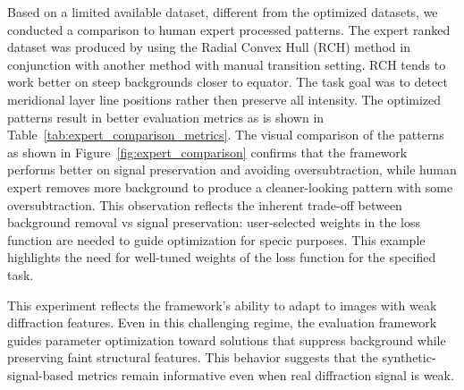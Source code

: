 \documentclass[iucr]{iucrjournals}
\begin{document}
Based on a limited available dataset, different from the optimized datasets, we conducted a comparison to human expert processed patterns. The expert ranked dataset was produced by using the Radial Convex Hull (RCH) method in conjunction with another method with manual transition setting. RCH tends to work better on steep backgrounds closer to equator. The task goal was to detect meridional layer line positions rather then preserve all intensity. The optimized patterns result in better evaluation metrics as is shown in Table~\ref{tab:expert_comparison_metrics}. The visual comparison of the patterns as shown in Figure~\ref{fig:expert_comparison} confirms that the framework performs better on signal preservation and avoiding oversubtraction, while human expert removes more background to produce a cleaner-looking pattern with some oversubtraction. This observation reflects the inherent trade-off between background removal vs signal preservation: user-selected weights in the loss function are needed to guide optimization for specic purposes. This example highlights the need for well-tuned weights of the loss function for the specified task.

This experiment reflects the framework's ability to adapt to images with weak diffraction features. Even in this challenging regime, the evaluation framework guides parameter optimization toward solutions that suppress background while preserving faint structural features. This behavior suggests that the synthetic-signal-based metrics remain informative even when real diffraction signal is weak.

\end{document}
